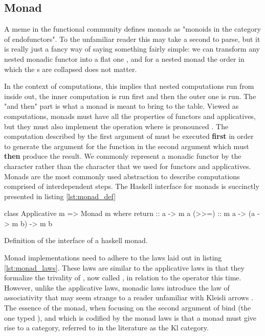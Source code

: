   \subsection{Monad}

  A meme in the functional community defines monads as "monoids in the
  category of endofunctors". To the unfamiliar reader this may take a
  second to parse, but it is really just a fancy way of saying something
  fairly simple: we can transform any nested monadic functor  into a flat one , and for a nested monad  the order in which the s are collapsed does
  not matter.

  In the context of computations, this implies that nested
  computations run from inside out, the inner computation is run first
  and then the outer one is run. The "and then" part is what a monad is
  meant to bring to the table. Viewed as computations, monads must have
  all the properties of functors and applicatives, but they must also
  implement the operation  where
  \hask{>>=} is pronounced . The computation described by the
  first argument of \hask{>>=} must be executed \textbf{first} in order
  to generate the argument for the function in the second argument which
  must \textbf{then} produce the result. We commonly represent a monadic
  functor by the character  rather than the character 
  that we used for functors and applicatives. Monads are the most
  commonly used abstraction to describe computations comprised of
  interdependent steps. The Haskell interface for monads is succinctly
  presented in listing \ref{lst:monad_def}

  \begin{code}
\begin{haskellcode}
class Applicative m => Monad m where
  return :: a -> m a
  (>>=) :: m a -> (a -> m b) -> m b
\end{haskellcode}
    \caption{\label{lst:monad_def}Definition of the interface of a
      haskell monad.}
  \end{code}

  Monad implementations need to adhere to the laws laid out in listing
  \ref{lst:monad_laws}. These laws are similar to the applicative laws
  in that they formalize the trivality of , now called
  , in relation to the  operator this
  time. However, unlike the applicative laws, monadic laws introduce the
  law of associativity that may seem strange to a reader unfamiliar with
  Kleisli arrows \cite{dawsonCompoundMonadsKleisli2007}. The essence of
  the monad, when focusing on the second argument of bind (the one typed
  ), and which is codified by the monad laws is that a
  monad  must give rise to a category, referred to in the
  literature as the Kl category.

